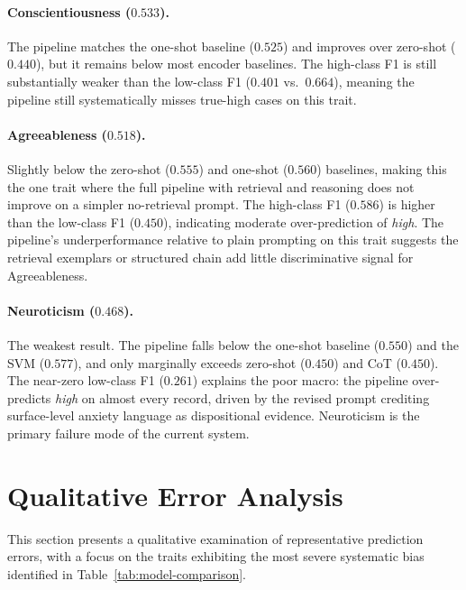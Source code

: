 \documentclass[../main.tex]{subfiles}
\begin{document}
\paragraph{Conscientiousness ($0.533$).}
The pipeline matches the one-shot baseline ($0.525$) and improves over zero-shot
($0.440$), but it remains below most encoder baselines. The high-class F1 is
still substantially weaker than the low-class F1 ($0.401$ vs.\ $0.664$), meaning
the pipeline still systematically misses true-high cases on this trait.

\paragraph{Agreeableness ($0.518$).}
Slightly below the zero-shot ($0.555$) and one-shot ($0.560$) baselines, making
this the one trait where the full pipeline with retrieval and reasoning does not
improve on a simpler no-retrieval prompt. The high-class F1 ($0.586$) is higher
than the low-class F1 ($0.450$), indicating moderate over-prediction of
\textit{high}. The pipeline's underperformance relative to plain prompting on
this trait suggests the retrieval exemplars or structured chain add little
discriminative signal for Agreeableness.

\paragraph{Neuroticism ($0.468$).}
The weakest result. The pipeline falls below the one-shot baseline ($0.550$) and
the SVM ($0.577$), and only marginally exceeds zero-shot ($0.450$) and CoT
($0.450$). The near-zero low-class F1 ($0.261$) explains the poor macro: the
pipeline over-predicts \textit{high} on almost every record, driven by the
revised prompt crediting surface-level anxiety language as dispositional evidence.
Neuroticism is the primary failure mode of the current system.

\section{Qualitative Error Analysis}
\label{sec:qualitative}

This section presents a qualitative examination of representative prediction
errors, with a focus on the traits exhibiting the most severe systematic
bias identified in Table~\ref{tab:model-comparison}.
\end{document}
